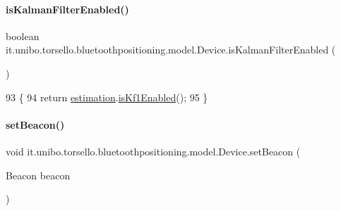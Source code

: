 \paragraph{\texorpdfstring{is\+Kalman\+Filter\+Enabled()}{isKalmanFilterEnabled()}}
{\footnotesize\ttfamily boolean it.\+unibo.\+torsello.\+bluetoothpositioning.\+model.\+Device.\+is\+Kalman\+Filter\+Enabled (\begin{DoxyParamCaption}{ }\end{DoxyParamCaption})}


\begin{DoxyCode}
93                                            \{
94         \textcolor{keywordflow}{return} \hyperlink{classit_1_1unibo_1_1torsello_1_1bluetoothpositioning_1_1model_1_1Device_ac619c42728cd40f41a5f12fde56b4425_ac619c42728cd40f41a5f12fde56b4425}{estimation}.\hyperlink{classit_1_1unibo_1_1torsello_1_1bluetoothpositioning_1_1distanceEstimation_1_1Estimation_a50dcba2a259a12247c634f0285fe6fba_a50dcba2a259a12247c634f0285fe6fba}{isKf1Enabled}();
95     \}
\end{DoxyCode}
\hypertarget{classit_1_1unibo_1_1torsello_1_1bluetoothpositioning_1_1model_1_1Device_a7aff672e35f15a271dd93bd59e413f28_a7aff672e35f15a271dd93bd59e413f28}{}\label{classit_1_1unibo_1_1torsello_1_1bluetoothpositioning_1_1model_1_1Device_a7aff672e35f15a271dd93bd59e413f28_a7aff672e35f15a271dd93bd59e413f28} 
\paragraph{\texorpdfstring{set\+Beacon()}{setBeacon()}}
{\footnotesize\ttfamily void it.\+unibo.\+torsello.\+bluetoothpositioning.\+model.\+Device.\+set\+Beacon (\begin{DoxyParamCaption}\item[{Beacon}]{beacon }\end{DoxyParamCaption})}


